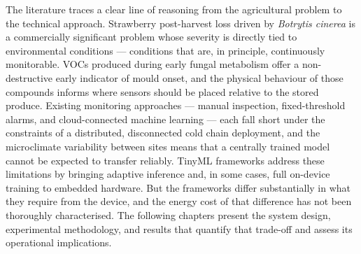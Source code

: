 The literature traces a clear line of reasoning from the agricultural problem to the technical approach. Strawberry post-harvest loss driven by \textit{Botrytis cinerea} is a commercially significant problem whose severity is directly tied to environmental conditions --- conditions that are, in principle, continuously monitorable. VOCs produced during early fungal metabolism offer a non-destructive early indicator of mould onset, and the physical behaviour of those compounds informs where sensors should be placed relative to the stored produce. Existing monitoring approaches --- manual inspection, fixed-threshold alarms, and cloud-connected machine learning --- each fall short under the constraints of a distributed, disconnected cold chain deployment, and the microclimate variability between sites means that a centrally trained model cannot be expected to transfer reliably. TinyML frameworks address these limitations by bringing adaptive inference and, in some cases, full on-device training to embedded hardware. But the frameworks differ substantially in what they require from the device, and the energy cost of that difference has not been thoroughly characterised. The following chapters present the system design, experimental methodology, and results that quantify that trade-off and assess its operational implications.
